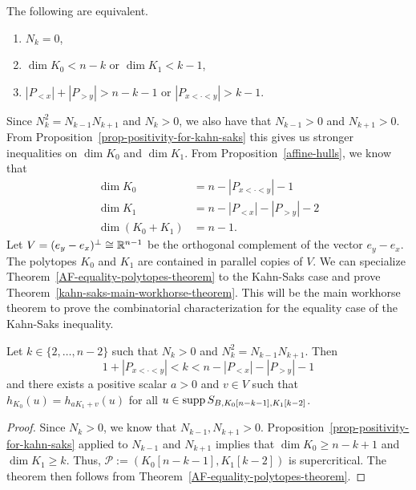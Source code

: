 \documentclass{puthesis-UG}
\begin{document}
\begin{prop} \label{prop-positivity-for-kahn-saks}
	The following are equivalent. 
	\begin{enumerate}[label = (\alph*)]
		\item $N_k = 0$, 
		\item $\dim K_0 < n-k$ or $\dim K_1 < k-1$, 
		\item $|P_{< x}| + |P_{> y}| > n-k-1$ or $|P_{x < \cdot < y}| > k-1$. 
	\end{enumerate}
\end{prop}

Since $N_k^2 = N_{k-1} N_{k+1}$ and $N_k > 0$, we also have that $N_{k-1} > 0$ and $N_{k+1} > 0$. From Proposition~\ref{prop-positivity-for-kahn-saks} this gives us stronger inequalities on $\dim K_0$ and $\dim K_1$. From Proposition~\ref{affine-hulls}, we know that
\begin{align*}
	\dim K_0 & = n - |P_{x < \cdot < y}| - 1 \\
	\dim K_1 & = n - |P_{<x}| - |P_{> y}| - 2 \\
	\dim (K_0 + K_1) & = n-1. 
\end{align*}
Let $V = (e_y - e_x)^\perp \cong \mathbb{R}^{n-1}$ be the orthogonal complement of the vector $e_y - e_x$. The polytopes $K_0$ and $K_1$ are contained in parallel copies of $V$. We can specialize Theorem~\ref{AF-equality-polytopes-theorem} to the Kahn-Saks case and prove Theorem~\ref{kahn-saks-main-workhorse-theorem}. This will be the main workhorse theorem to prove the combinatorial characterization for the equality case of the Kahn-Saks inequality.

\begin{thm} \label{kahn-saks-main-workhorse-theorem}
	Let $k \in \{2, \ldots, n-2\}$ such that $N_k > 0$ and $N_k^2 = N_{k-1} N_{k+1}$. Then 
	\[
		1 + |P_{x < \cdot < y}| < k < n - |P_{< x}| - |P_{> y}| - 1
	\]
	and there exists a positive scalar $a > 0$ and $v \in V$ such that $h_{K_0}(u) = h_{aK_1 + v}(u)$ for all $u \in \operatorname{supp} S_{B, K_0[n-k-1], K_1[k-2]}$.
\end{thm}

\begin{proof}
	Since $N_k > 0$, we know that $N_{k-1}, N_{k+1} > 0$. Proposition~\ref{prop-positivity-for-kahn-saks} applied to $N_{k-1}$ and $N_{k+1}$ implies that $\dim K_0 \geq n-k+1$ and $\dim K_1 \geq k$. Thus, $\mathcal{P} := (K_0[n-k-1], K_1[k-2])$ is supercritical. The theorem then follows from Theorem~\ref{AF-equality-polytopes-theorem}. 
\end{proof}
\end{document}
